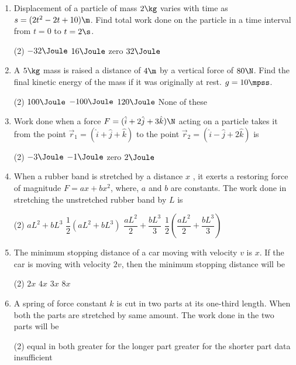\documentclass{article}
\begin{document}
\begin{enumerate}
\item Displacement of a particle of mass $2 \kg$ varies with time as $s = (2t^2 - 2t + 10) \m$. Find total work done on the particle in a time interval from $t = 0$ to $t = 2 \s$.
\begin{tasks}(2)
	\task $-32\Joule$
	\task $16\Joule$
	\task zero
	\task $32\Joule$\ans
\end{tasks}

\item A $5\kg$ mass is raised a distance of $4\m$ by a vertical force of $80\N$. Find the final kinetic energy of the mass if it was originally at rest. $g = 10\mpss$.
\begin{tasks}(2)
	\task $100\Joule$
	\task $-100\Joule$
	\task $120\Joule$\ans
	\task None of these
\end{tasks}

\item Work done when a force $F=(\hat{i}+2\hat{j}+3\hat{k})\N$ acting on a particle takes it from the point $\vec{r}_1 = (\hat{i} + \hat{j} + \hat{k} )$ to the point $\vec{r}_2 = (\hat{i} - \hat{j} + 2 \hat{k} )$ is
\begin{tasks}(2)
	\task $-3\Joule$
	\task $-1\Joule$\ans
	\task zero
	\task $2\Joule$
\end{tasks}

\item When a rubber band is stretched by a distance $x$ , it
exerts a restoring force of magnitude $F = ax + bx^2$, where, $a$ and $b$ are constants. The work done in stretching the unstretched rubber band by $L$ is
\begin{tasks}(2)
	\task $aL^2+bL^3$
	\task $\dfrac{1}{2}\left(aL^2+bL^3\right)$
	\task $\dfrac{aL^2}{2} + \dfrac{bL^3}{3}$\ans
	\task $\dfrac{1}{2}\left( \dfrac{aL^2}{2} + \dfrac{bL^3}{3} \right)$
\end{tasks}



\item The minimum stopping distance of a car moving with velocity $v$ is $x$. If the car is moving with velocity $2v$, then the minimum stopping distance will be
\begin{tasks}(2)
	\task $2x$
	\task $4x$\ans
	\task $3x$
	\task $8x$
\end{tasks}

\item A spring of force constant $k$ is cut in two parts at its one-third length. When both the parts are stretched by same amount. The work done in the two parts will be
\begin{tasks}(2)
	\task equal in both
	\task greater for the longer part
	\task greater for the shorter part\ans
	\task data insufficient
\end{tasks}


\end{enumerate}
\end{document}
